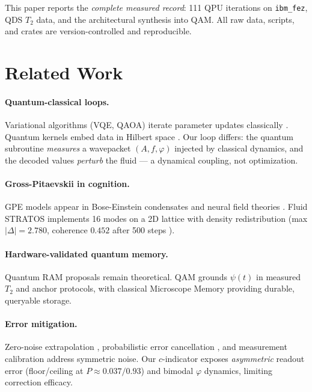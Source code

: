\documentclass[sigconf,anonymous=false]{acmart}
\begin{document}
This paper reports the \emph{complete measured record}: 111 QPU iterations on \texttt{ibm\_fez}, QDS $T_2$ data, and the architectural synthesis into QAM. All raw data, scripts, and crates are version-controlled and reproducible.

\section{Related Work}

\paragraph{Quantum-classical loops.} Variational algorithms (VQE, QAOA) iterate parameter updates classically \cite{Peruzzo2014, Farhi2014}. Quantum kernels embed data in Hilbert space \cite{Havlicek2019}. Our loop differs: the quantum subroutine \emph{measures} a wavepacket $(A,f,\varphi)$ injected by classical dynamics, and the decoded values \emph{perturb} the fluid --- a dynamical coupling, not optimization.

\paragraph{Gross-Pitaevskii in cognition.} GPE models appear in Bose-Einstein condensates \cite{Pitaevskii2003} and neural field theories \cite{Coombes2005}. Fluid STRATOS implements 16 modes on a 2D lattice with density redistribution (max $|\Delta| = 2.780$, coherence $0.452$ after 500 steps \cite{QOI-gpe}).

\paragraph{Hardware-validated quantum memory.} Quantum RAM proposals \cite{Giovannetti2008} remain theoretical. QAM grounds $\psi(t)$ in measured $T_2$ and anchor protocols, with classical Microscope Memory providing durable, queryable storage.

\paragraph{Error mitigation.} Zero-noise extrapolation \cite{Temme2017}, probabilistic error cancellation \cite{Endo2018}, and measurement calibration \cite{Nation2019} address symmetric noise. Our $c$-indicator exposes \emph{asymmetric} readout error (floor/ceiling at $P\approx 0.037/0.93$) and bimodal $\varphi$ dynamics, limiting correction efficacy.
\end{document}
